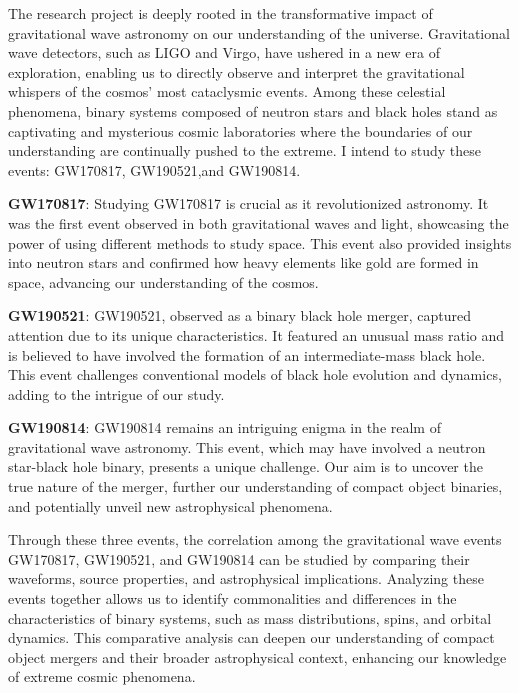 The research project is deeply rooted in the transformative impact of gravitational wave astronomy on our understanding of the universe. Gravitational wave detectors, such as LIGO and Virgo, have ushered in a new era of exploration, enabling us to directly observe and interpret the gravitational whispers of the cosmos' most cataclysmic events. Among these celestial phenomena, binary systems composed of neutron stars and black holes stand as captivating and mysterious cosmic laboratories where the boundaries of our understanding are continually pushed to the extreme. I intend to study these events: GW170817, GW190521,and GW190814.
\vspace{0.4cm}

\textbf{GW170817}:
Studying GW170817 is crucial as it revolutionized astronomy. It was the first event observed in both gravitational waves and light, showcasing the power of using different methods to study space. This event also provided insights into neutron stars and confirmed how heavy elements like gold are formed in space, advancing our understanding of the cosmos.
\vspace{0.4cm}

\textbf{GW190521}:
GW190521, observed as a binary black hole merger, captured attention due to its unique characteristics. It featured an unusual mass ratio and is believed to have involved the formation of an intermediate-mass black hole. This event challenges conventional models of black hole evolution and dynamics, adding to the intrigue of our study.
\vspace{0.4cm}

\textbf{GW190814}:
GW190814 remains an intriguing enigma in the realm of gravitational wave astronomy. This event, which may have involved a neutron star-black hole binary, presents a unique challenge. Our aim is to uncover the true nature of the merger, further our understanding of compact object binaries, and potentially unveil new astrophysical phenomena.
\vspace{0.3cm}

Through these three events, the correlation among the gravitational wave events GW170817, GW190521, and GW190814 can be studied by comparing their waveforms, source properties, and astrophysical implications. Analyzing these events together allows us to identify commonalities and differences in the characteristics of binary systems, such as mass distributions, spins, and orbital dynamics. This comparative analysis can deepen our understanding of compact object mergers and their broader astrophysical context, enhancing our knowledge of extreme cosmic phenomena.
